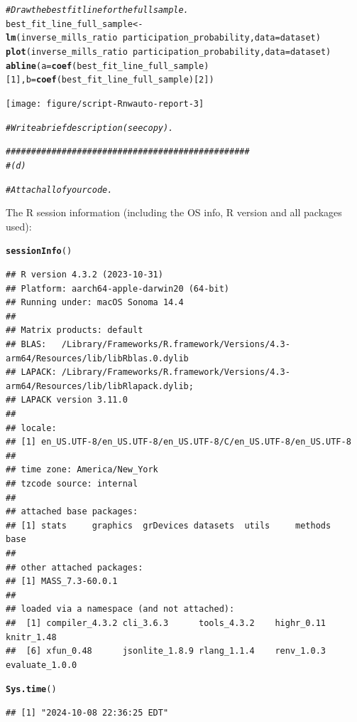 \documentclass{article}\usepackage[]{graphicx}\usepackage[]{xcolor}
\makeatletter
\newcommand{\hlnum}[1]{\textcolor[rgb]{0.686,0.059,0.569}{#1}}%
\newcommand{\hlcom}[1]{\textcolor[rgb]{0.678,0.584,0.686}{\textit{#1}}}%
\newcommand{\hlopt}[1]{\textcolor[rgb]{0,0,0}{#1}}%
\newcommand{\hldef}[1]{\textcolor[rgb]{0.345,0.345,0.345}{#1}}%
\newcommand{\hlkwb}[1]{\textcolor[rgb]{0.69,0.353,0.396}{#1}}%
\newcommand{\hlkwc}[1]{\textcolor[rgb]{0.333,0.667,0.333}{#1}}%
\newcommand{\hlkwd}[1]{\textcolor[rgb]{0.737,0.353,0.396}{\textbf{#1}}}%
\newenvironment{kframe}{%
 \def\at@end@of@kframe{}%
 \ifinner\ifhmode%
  \def\at@end@of@kframe{\end{minipage}}%
  \begin{minipage}{\columnwidth}%
 \fi\fi%
 \def\FrameCommand##1{\hskip\@totalleftmargin \hskip-\fboxsep
 \colorbox{shadecolor}{##1}\hskip-\fboxsep
     \hskip-\linewidth \hskip-\@totalleftmargin \hskip\columnwidth}%
 \MakeFramed {\advance\hsize-\width
   \@totalleftmargin\z@ \linewidth\hsize
   \@setminipage}}%
 {\par\unskip\endMakeFramed%
 \at@end@of@kframe}
\newenvironment{knitrout}{}{} %
\makeatother
\begin{document}
\begin{knitrout}
{}


\begin{kframe}\begin{alltt}
\hlcom{# Draw the best fit line for the full sample.}
\hldef{best_fit_line_full_sample} \hlkwb{<-} \hlkwd{lm}\hldef{(inverse_mills_ratio}\hlopt{~}\hldef{participation_probability,} \hlkwc{data}\hldef{=dataset)}
\hlkwd{plot}\hldef{(inverse_mills_ratio}\hlopt{~}\hldef{participation_probability,} \hlkwc{data}\hldef{=dataset)}
\hlkwd{abline}\hldef{(}\hlkwc{a}\hldef{=}\hlkwd{coef}\hldef{(best_fit_line_full_sample)[}\hlnum{1}\hldef{],} \hlkwc{b}\hldef{=}\hlkwd{coef}\hldef{(best_fit_line_full_sample)[}\hlnum{2}\hldef{])}
\end{alltt}
\end{kframe}

{\centering \texttt{[image: figure/script-Rnwauto-report-3]} 

}


\begin{kframe}\begin{alltt}
\hlcom{#Write a brief description (see copy).}

\hlcom{################################################}
\hlcom{# (d)}

\hlcom{# Attach all of your code.}
\end{alltt}
\end{kframe}
\end{knitrout}

The R session information (including the OS info, R version and all
packages used):

\begin{knitrout}
\color{fgcolor}\begin{kframe}
\begin{alltt}
\hlkwd{sessionInfo}\hldef{()}
\end{alltt}
\begin{verbatim}
## R version 4.3.2 (2023-10-31)
## Platform: aarch64-apple-darwin20 (64-bit)
## Running under: macOS Sonoma 14.4
## 
## Matrix products: default
## BLAS:   /Library/Frameworks/R.framework/Versions/4.3-arm64/Resources/lib/libRblas.0.dylib 
## LAPACK: /Library/Frameworks/R.framework/Versions/4.3-arm64/Resources/lib/libRlapack.dylib;
## LAPACK version 3.11.0
## 
## locale:
## [1] en_US.UTF-8/en_US.UTF-8/en_US.UTF-8/C/en_US.UTF-8/en_US.UTF-8
## 
## time zone: America/New_York
## tzcode source: internal
## 
## attached base packages:
## [1] stats     graphics  grDevices datasets  utils     methods   base     
## 
## other attached packages:
## [1] MASS_7.3-60.0.1
## 
## loaded via a namespace (and not attached):
##  [1] compiler_4.3.2 cli_3.6.3      tools_4.3.2    highr_0.11     knitr_1.48    
##  [6] xfun_0.48      jsonlite_1.8.9 rlang_1.1.4    renv_1.0.3     evaluate_1.0.0
\end{verbatim}
\begin{alltt}
\hlkwd{Sys.time}\hldef{()}
\end{alltt}
\begin{verbatim}
## [1] "2024-10-08 22:36:25 EDT"
\end{verbatim}
\end{kframe}
\end{knitrout}
\end{document}
